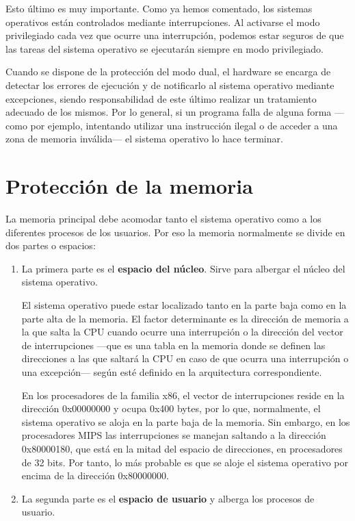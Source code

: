 Esto último es muy importante. Como ya hemos comentado, los sistemas
operativos están controlados mediante interrupciones. Al activarse el
modo privilegiado cada vez que ocurre una interrupción, podemos estar
seguros de que las tareas del sistema operativo se ejecutarán siempre en
modo privilegiado.

Cuando se dispone de la protección del modo dual, el hardware se encarga
de detectar los errores de ejecución y de notificarlo al sistema
operativo mediante excepciones, siendo responsabilidad de este último
realizar un tratamiento adecuado de los mismos. Por lo general, si un
programa falla de alguna forma ---como por ejemplo, intentando utilizar
una instrucción ilegal o de acceder a una zona de memoria inválida--- el
sistema operativo lo hace terminar.

\section{Protección de la memoria}\label{_protecciuxf3n_de_la_memoria}

La memoria principal debe acomodar tanto el sistema operativo como a los
diferentes procesos de los usuarios. Por eso la memoria normalmente se
divide en dos partes o espacios:

\begin{enumerate}
\def\labelenumi{\arabic{enumi}.}
\item
  La primera parte es el \textbf{espacio del núcleo}{}. Sirve para
  albergar el núcleo del sistema operativo.

  El sistema operativo puede estar localizado tanto en la parte baja
  como en la parte alta de la memoria. El factor determinante es la
  dirección de memoria a la que salta la CPU cuando ocurre una
  interrupción o la dirección del vector de interrupciones ---que es una
  tabla en la memoria donde se definen las direcciones a las que saltará
  la CPU en caso de que ocurra una interrupción o una excepción--- según
  esté definido en la arquitectura correspondiente.

  En los procesadores de la familia x86, el vector de interrupciones
  reside en la dirección 0x00000000 y ocupa 0x400 bytes, por lo que,
  normalmente, el sistema operativo se aloja en la parte baja de la
  memoria. Sin embargo, en los procesadores MIPS las interrupciones se
  manejan saltando a la dirección 0x80000180, que está en la mitad del
  espacio de direcciones, en procesadores de 32 bits. Por tanto, lo más
  probable es que se aloje el sistema operativo por encima de la
  dirección 0x80000000.
\item
  La segunda parte es el \textbf{espacio de usuario}{} y alberga los
  procesos de usuario.
\end{enumerate}

